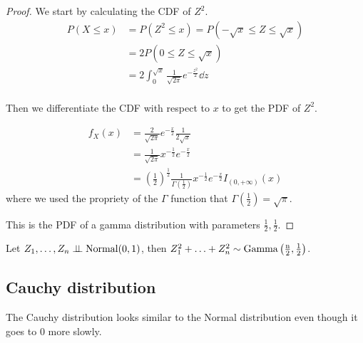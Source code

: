 \documentclass[12pt]{extarticle}
\begin{document}
\begin{proof}
    We start by calculating the CDF of $Z^2$.
    \begin{align}
        P(X \leq x) & = P(Z^2 \leq x) = P(-\sqrt{x} \leq Z \leq \sqrt{x})                  \\
                    & = 2P(0 \leq Z \leq \sqrt{x})                                         \\
                    & = 2\int_0^{\sqrt{x}} \frac{1}{\sqrt{2\pi}} e^{-\frac{z^2}{2}} \dd{z} \\
    \end{align}

    Then we differentiate the CDF with respect to $x$ to get the PDF of $Z^2$.

    \begin{align}
        f_X(x) & = \frac{2}{\sqrt{2\pi}} e^{-\frac{x}{2}} \frac{1}{2\sqrt{x}}                                                                          \\
               & = \frac{1}{\sqrt{2\pi}} x^{-\frac{1}{2}} e^{-\frac{x}{2}}                                                                             \\
               & = \left(\frac{1}{2}\right)^\frac{1}{2} \frac{1}{\Gamma\left(\frac{1}{2}\right)} x^{-\frac{1}{2}} e^{-\frac{x}{2}} I_{(0, +\infty)}(x)
    \end{align}
    where we used the propriety of the $\Gamma$ function that $\Gamma\left(\frac{1}{2}\right) = \sqrt{\pi}$.

    This is the PDF of a gamma distribution with parameters $\frac{1}{2}, \frac{1}{2}$.
\end{proof}

\begin{lemma}
    Let $Z_1, \ldots, Z_n \indep \operatorfont{Normal}(0, 1)$, then $Z_1^2 + \ldots + Z_n^2 \sim \operatorfont{Gamma}\left(\frac{n}{2}, \frac{1}{2}\right)$.
\end{lemma}

\subsection{Cauchy distribution}

The Cauchy distribution looks similar to the Normal distribution even though it goes to $0$ more slowly.
\end{document}
